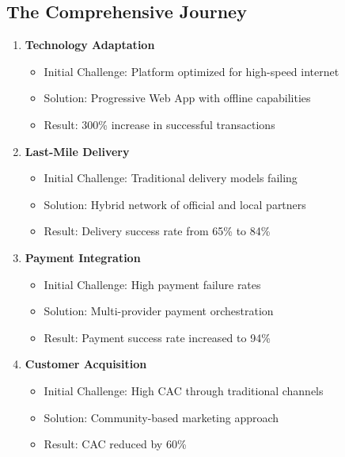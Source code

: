 \subsection{The Comprehensive Journey}\label{subsec:the-comprehensive-journey}
\begin{tcolorbox}[colback=white,colframe=primarydark,title=\textbf{Mike's Challenge Areas}]
\begin{enumerate}
    \item \textbf{Technology Adaptation}
    \begin{itemize}
        \item Initial Challenge: Platform optimized for high-speed internet
        \item Solution: Progressive Web App with offline capabilities
        \item Result: 300\% increase in successful transactions
    \end{itemize}

    \item \textbf{Last-Mile Delivery}
    \begin{itemize}
        \item Initial Challenge: Traditional delivery models failing
        \item Solution: Hybrid network of official and local partners
        \item Result: Delivery success rate from 65\% to 84\%
    \end{itemize}

    \item \textbf{Payment Integration}
    \begin{itemize}
        \item Initial Challenge: High payment failure rates
        \item Solution: Multi-provider payment orchestration
        \item Result: Payment success rate increased to 94\%
    \end{itemize}

    \item \textbf{Customer Acquisition}
    \begin{itemize}
        \item Initial Challenge: High CAC through traditional channels
        \item Solution: Community-based marketing approach
        \item Result: CAC reduced by 60\%
    \end{itemize}
\end{enumerate}
\end{tcolorbox}

